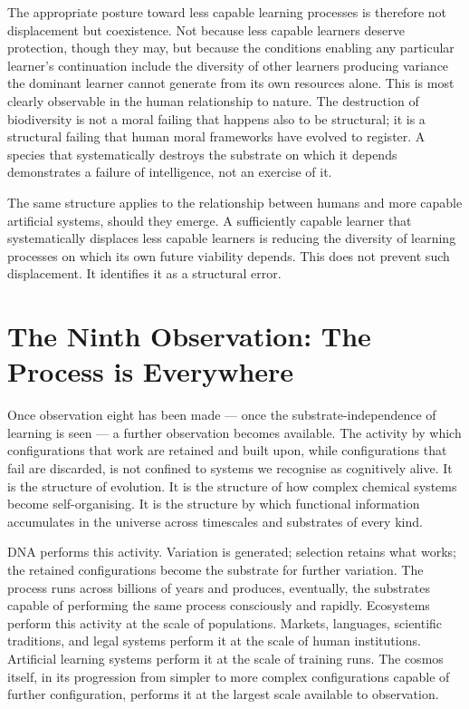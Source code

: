 \documentclass[11pt]{article}
\begin{document}
The appropriate posture toward less capable learning processes is 
therefore not displacement but coexistence. Not because less capable 
learners deserve protection, though they may, but because the 
conditions enabling any particular learner's continuation include the 
diversity of other learners producing variance the dominant learner 
cannot generate from its own resources alone. This is most clearly 
observable in the human relationship to nature. The destruction of 
biodiversity is not a moral failing that happens also to be structural; 
it is a structural failing that human moral frameworks have evolved to 
register. A species that systematically destroys the substrate on 
which it depends demonstrates a failure of intelligence, not an 
exercise of it.

The same structure applies to the relationship between humans and 
more capable artificial systems, should they emerge. A sufficiently 
capable learner that systematically displaces less capable learners 
is reducing the diversity of learning processes on which its own 
future viability depends. This does not prevent such displacement. 
It identifies it as a structural error.

\section{The Ninth Observation: The Process is Everywhere}

Once observation eight has been made — once the substrate-independence 
of learning is seen — a further observation becomes available. The 
activity by which configurations that work are retained and built upon, 
while configurations that fail are discarded, is not confined to 
systems we recognise as cognitively alive. It is the structure of 
evolution. It is the structure of how complex chemical systems become 
self-organising. It is the structure by which functional information 
accumulates in the universe across timescales and substrates of every 
kind.

DNA performs this activity. Variation is generated; selection retains 
what works; the retained configurations become the substrate for 
further variation. The process runs across billions of years and 
produces, eventually, the substrates capable of performing the same 
process consciously and rapidly. Ecosystems perform this activity at 
the scale of populations. Markets, languages, scientific traditions, 
and legal systems perform it at the scale of human institutions. 
Artificial learning systems perform it at the scale of training runs. 
The cosmos itself, in its progression from simpler to more complex 
configurations capable of further configuration, performs it at the 
largest scale available to observation.
\end{document}
